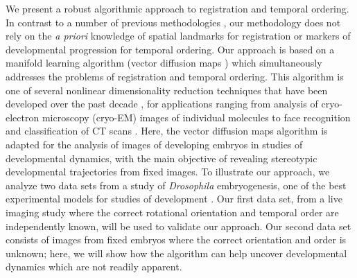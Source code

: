 \documentclass{pnastwo}
\makeatletter
\newcommand{\customlabel}[2]{%
\protected@write \@auxout {}{\string \newlabel {#1}{{#2}{}}}}
\makeatother
\begin{document}
\begin{article}


We present a robust algorithmic approach to registration and temporal ordering.
%
In contrast to a number of previous methodologies \cite{zitova2003image, rowley1998rotation, hajnal2010medical, greenspan1994rotation, zhao2003face}, our methodology does not rely on the {\em a priori} knowledge of spatial landmarks for registration or markers of developmental progression for temporal ordering.
%
Our approach is based on a manifold learning algorithm (vector diffusion maps \cite{singer2012vector}) which simultaneously addresses the problems of registration and temporal ordering. 
%
This algorithm is one of several nonlinear dimensionality reduction techniques that have been developed over the past decade \cite{Belkin2003, coifman2005geometric, coifman2006geometric, tenenbaum2000global, roweis2000nonlinear}, for
applications ranging from analysis of cryo-electron microscopy (cryo-EM) images of individual molecules  \cite{zhao2014rotationally, singer2011viewing} to face recognition \cite{lafon2006data} and classification of CT scans \cite{fernandez2014diffusion}.
%
Here, the vector diffusion maps algorithm is adapted for the analysis of images of developing embryos in studies of developmental dynamics, with the main objective of revealing stereotypic developmental trajectories from fixed images.
%
To illustrate our approach, we analyze two data sets from a study of {\it Drosophila} embryogenesis, one of the best experimental models for studies of development \cite{jaeger2012drosophila}.
%
Our first data set, from a live imaging study where the correct rotational orientation and temporal order are independently known, will be used to validate our approach.
%
Our second data set consists of images from fixed embryos where the correct orientation and order is unknown; here, we will show how the algorithm can help uncover developmental dynamics which are not readily apparent. 



\end{article}
\end{document}
